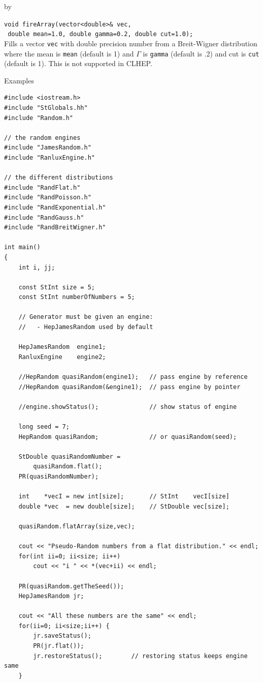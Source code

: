 \documentclass[twoside]{article}
\newcommand{\comp}[1]{\texttt{#1}}%
\newcommand{\entrylabel}[1]{\mbox{\textbf{{#1}}}\hfil}%
\newenvironment{entry}
{\begin{list}{}%
    {\renewcommand{\makelabel}{\entrylabel}%
     \setlength{\labelwidth}{90pt}%
     \setlength{\leftmargin}{\labelwidth}
     \advance\leftmargin by \labelsep%
      }%
    }%
  {\end{list}}
\newcommand{\Entrylabel}[1]%
{\raisebox{0pt}[1ex][0pt]{\makebox[\labelwidth][l]%
    {\parbox[t]{\labelwidth}{\hspace{0pt}\textbf{{#1}}}}}}
\newenvironment{Entry}%
{\renewcommand{\entrylabel}{\Entrylabel}\begin{entry}}%
  {\end{entry}}
\begin{document}
\begin{Entry}
    \verb+void fireArray(vector<double>& vec,+\\
    \verb+ double mean=1.0, double gamma=0.2, double cut=1.0);+\\
    Fills a vector \comp{vec} with double
    precision number from a Breit-Wigner
    distribution where the mean is \comp{mean} (default is 1)
    and $\Gamma$ is \comp{gamma} (default is .2) and cut is
    \comp{cut} (default is 1).  This is not supported in CLHEP.
    
     
\item[Examples]
{\footnotesize
\begin{verbatim}
#include <iostream.h>
#include "StGlobals.hh"
#include "Random.h"

// the random engines
#include "JamesRandom.h"
#include "RanluxEngine.h"

// the different distributions
#include "RandFlat.h"
#include "RandPoisson.h"
#include "RandExponential.h"
#include "RandGauss.h"
#include "RandBreitWigner.h"

int main()
{
    int i, jj;
    
    const StInt size = 5;
    const StInt numberOfNumbers = 5;
    
    // Generator must be given an engine:
    //   - HepJamesRandom used by default

    HepJamesRandom  engine1;
    RanluxEngine    engine2;
    
    //HepRandom quasiRandom(engine1);   // pass engine by reference
    //HepRandom quasiRandom(&engine1);  // pass engine by pointer

    //engine.showStatus();              // show status of engine
    
    long seed = 7;
    HepRandom quasiRandom;              // or quasiRandom(seed);
    
    StDouble quasiRandomNumber =
        quasiRandom.flat();
    PR(quasiRandomNumber);

    int    *vecI = new int[size];       // StInt    vecI[size]
    double *vec  = new double[size];    // StDouble vec[size];
    
    quasiRandom.flatArray(size,vec);

    cout << "Pseudo-Random numbers from a flat distribution." << endl;
    for(int ii=0; ii<size; ii++)
        cout << "i " << *(vec+ii) << endl;
        
    PR(quasiRandom.getTheSeed());
    HepJamesRandom jr;

    cout << "All these numbers are the same" << endl;
    for(ii=0; ii<size;ii++) {
        jr.saveStatus();
        PR(jr.flat());
        jr.restoreStatus();        // restoring status keeps engine same
    }


\end{verbatim}}
\end{Entry}
\end{document}
